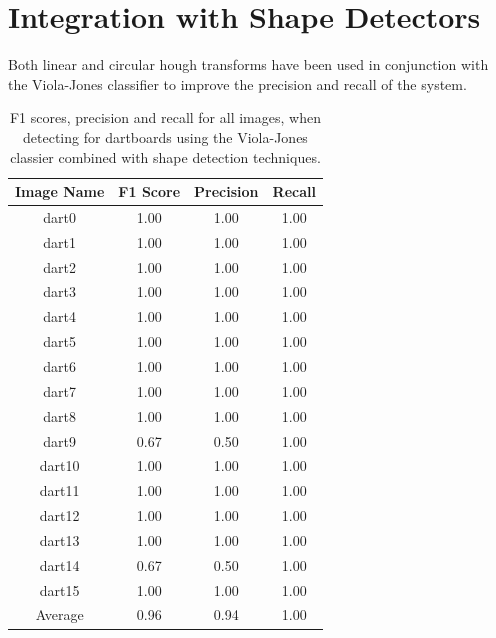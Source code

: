 \documentclass[conference]{IEEEtran}
\begin{document}
\section{Integration with Shape Detectors}
Both linear and circular hough transforms have been used in conjunction with the Viola-Jones classifier to improve the precision and recall of the system. 
\begin{table}[htp]
\caption{F1 scores, precision and recall for all images, when detecting for dartboards using the Viola-Jones classier combined with shape detection techniques. }
\begin{center}
\begin{tabular}{||c|c|c|c||}
\hline
Image Name		 	& F1 Score 	& Precision	& Recall            \\ \hline
dart0					& 1.00		&	1.00		& 1.00		\\
dart1					& 1.00		&	1.00		& 1.00		\\
dart2					& 1.00		&	1.00		& 1.00		\\
dart3					& 1.00		&	1.00		& 1.00		\\
dart4					& 1.00		&	1.00		& 1.00		\\
dart5					& 1.00		&	1.00		& 1.00		\\
dart6					& 1.00		&	1.00		& 1.00		\\
dart7					& 1.00		&	1.00		& 1.00		\\
dart8					& 1.00		&	1.00		& 1.00		\\
dart9					& 0.67		&	0.50		& 1.00		\\
dart10				& 1.00		&	1.00		& 1.00		\\
dart11				& 1.00		&	1.00		& 1.00		\\
dart12				& 1.00		&	1.00		& 1.00		\\
dart13				& 1.00		&	1.00		& 1.00		\\
dart14				& 0.67		&	0.50		& 1.00		\\
dart15				& 1.00		&	1.00		& 1.00		\\ \hline
Average 		 		& 0.96		&	0.94		& 1.00 		\\ \hline
\end{tabular}
\end{center}
\label{default}
\end{table}
\end{document}
